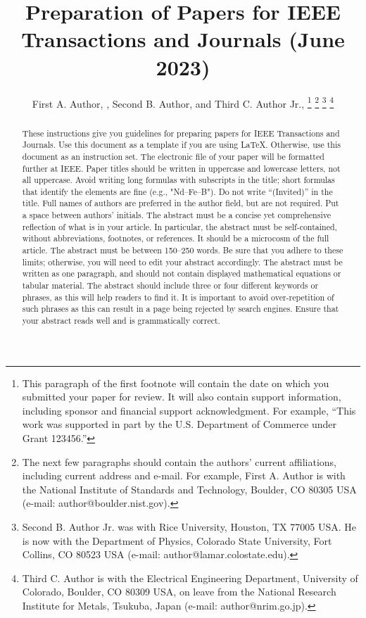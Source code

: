 \documentclass[journal,twoside,web]{ieeecolor}
\begin{document}
\title{Preparation of Papers for IEEE Transactions and Journals (June 2023)}
\author{First A. Author, , Second B. Author, and Third C. Author Jr., 
\thanks{This paragraph of the first footnote will contain the date on 
which you submitted your paper for review. It will also contain support 
information, including sponsor and financial support acknowledgment. For 
example, ``This work was supported in part by the U.S. Department of 
Commerce under Grant 123456.'' }
\thanks{The next few paragraphs should contain 
the authors' current affiliations, including current address and e-mail. For 
example, First A. Author is with the National Institute of Standards and 
Technology, Boulder, CO 80305 USA (e-mail: author@boulder.nist.gov). }
\thanks{Second B. Author Jr. was with Rice University, Houston, TX 77005 USA. He is 
now with the Department of Physics, Colorado State University, Fort Collins, 
CO 80523 USA (e-mail: author@lamar.colostate.edu).}
\thanks{Third C. Author is with 
the Electrical Engineering Department, University of Colorado, Boulder, CO 
80309 USA, on leave from the National Research Institute for Metals, 
Tsukuba, Japan (e-mail: author@nrim.go.jp).}}

\maketitle

\begin{abstract}
These instructions give you guidelines for preparing papers for 
IEEE Transactions and Journals. Use this document as a template if you are 
using \LaTeX. Otherwise, use this document as an 
instruction set. The electronic file of your paper will be formatted further 
at IEEE. Paper titles should be written in uppercase and lowercase letters, 
not all uppercase. Avoid writing long formulas with subscripts in the title; 
short formulas that identify the elements are fine (e.g., "Nd--Fe--B"). Do 
not write ``(Invited)'' in the title. Full names of authors are preferred in 
the author field, but are not required. Put a space between authors' 
initials. The abstract must be a concise yet comprehensive reflection of 
what is in your article. In particular, the abstract must be self-contained, 
without abbreviations, footnotes, or references. It should be a microcosm of 
the full article. The abstract must be between 150--250 words. Be sure that 
you adhere to these limits; otherwise, you will need to edit your abstract 
accordingly. The abstract must be written as one paragraph, and should not 
contain displayed mathematical equations or tabular material. The abstract 
should include three or four different keywords or phrases, as this will 
help readers to find it. It is important to avoid over-repetition of such 
phrases as this can result in a page being rejected by search engines. 
Ensure that your abstract reads well and is grammatically correct.
\end{abstract}
\end{document}
